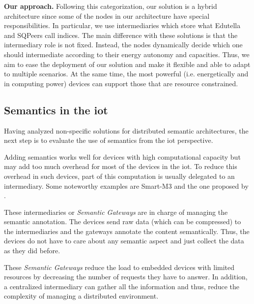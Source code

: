 \noindent\textbf{Our approach.}
Following this categorization, our solution is a hybrid architecture since some of the nodes in our architecture have special responsibilities.
In particular, we use intermediaries which store what Edutella and SQPeers call indices.
The main difference with these solutions is that the intermediary role is not fixed. %
Instead, the nodes dynamically decide which one should intermediate according to their energy autonomy and capacities.
Thus, we aim to ease the deployment of our solution and make it flexible and able to adapt to multiple scenarios.
At the same time, the most powerful (i.e. energetically and in computing power) devices can support those that are resource constrained.


\subsection{Semantics in the \acl{iot}}
Having analyzed non-specific solutions for distributed semantic architectures, the next step is to evaluate the use of semantics from the \ac{iot} perspective.

Adding semantics works well for devices with high computational capacity but may add too much overhead for most of the devices in the \ac{iot}.
To reduce this overhead in such devices, part of this computation is usually delegated to an intermediary.
Some noteworthy examples are Smart-M3 \citep{honkola_smart-m3_2010} and the one proposed by \citet{broring_semantic_2009}.

These intermediaries or \emph{Semantic Gateways} are in charge of managing the semantic annotation.
The devices send raw data (which can be compressed) to the intermediaries and the gateways annotate the content semantically.
Thus, the devices do not have to care about any semantic aspect and just collect the data as they did before.

These \emph{Semantic Gateways} reduce the load to embedded devices with limited resources by decreasing the number of requests they have to answer.
In addition, a centralized intermediary can gather all the information and thus, reduce the complexity of managing a distributed environment.

